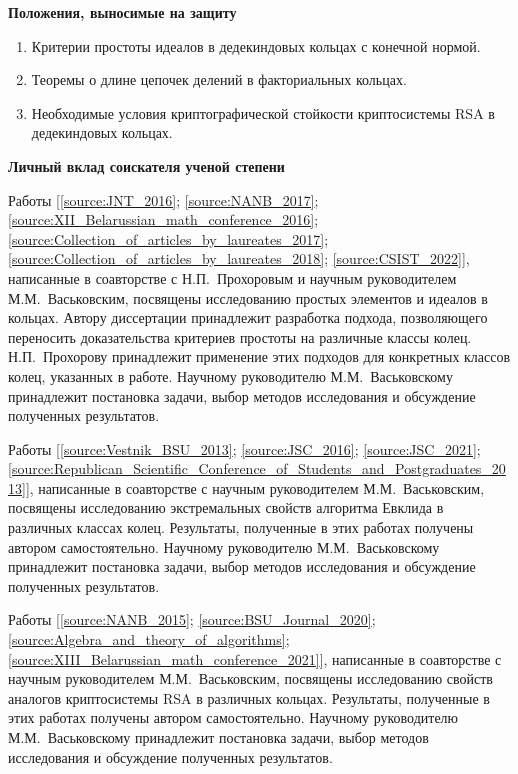 \documentclass[_00_dissertation.tex]{subfiles}
\begin{document}
\begin{center}
\textbf{Положения, выносимые на защиту}
\end{center}

\begin{enumerate}
    \item Критерии простоты идеалов в дедекиндовых кольцах с конечной нормой.
    
    \item Теоремы о длине цепочек делений в факториальных кольцах.
    
    \item Необходимые условия криптографической стойкости криптосистемы RSA в дедекиндовых кольцах.
\end{enumerate}

\begin{center}
\textbf{Личный вклад соискателя ученой степени}
\end{center}

Работы [\ref{source:JNT_2016}; \ref{source:NANB_2017}; \ref{source:XII_Belarussian_math_conference_2016}; \ref{source:Collection_of_articles_by_laureates_2017}; \ref{source:Collection_of_articles_by_laureates_2018}; \ref{source:CSIST_2022}], написанные в соавторстве с Н.П.~Прохоровым и научным руководителем М.М.~Васьковским, посвящены исследованию простых элементов и идеалов в кольцах.
Автору диссертации принадлежит разработка подхода, позволяющего переносить доказательства критериев простоты на различные классы колец.
Н.П.~Прохорову принадлежит применение этих подходов для конкретных классов колец, указанных в работе.
Научному руководителю М.М.~Васьковскому принадлежит постановка задачи, выбор методов исследования и обсуждение полученных результатов.

Работы [\ref{source:Vestnik_BSU_2013}; \ref{source:JSC_2016}; \ref{source:JSC_2021}; \ref{source:Republican_Scientific_Conference_of_Students_and_Postgraduates_2013}], написанные в соавторстве с научным руководителем М.М.~Васьковским, посвящены исследованию экстремальных свойств алгоритма Евклида в различных  классах колец.
Результаты, полученные  в этих работах получены  автором самостоятельно.
Научному руководителю М.М.~Васьковскому принадлежит постановка задачи, выбор методов исследования и обсуждение полученных результатов.

Работы [\ref{source:NANB_2015}; \ref{source:BSU_Journal_2020}; \ref{source:Algebra_and_theory_of_algorithms}; \ref{source:XIII_Belarussian_math_conference_2021}], написанные в соавторстве с научным руководителем М.М.~Васьковским, посвящены исследованию свойств аналогов криптосистемы RSA в различных кольцах.
Результаты, полученные  в этих работах получены  автором самостоятельно.
Научному руководителю М.М.~Васьковскому принадлежит постановка задачи, выбор методов исследования и обсуждение полученных результатов.
\end{document}
